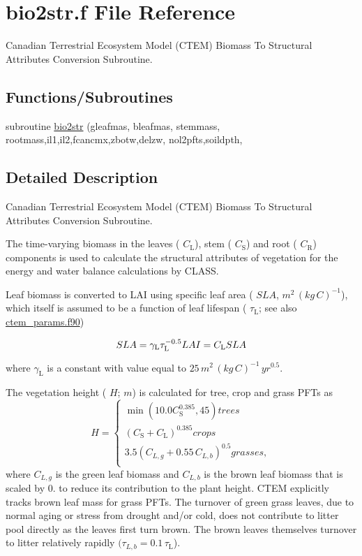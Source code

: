 \hypertarget{bio2str_8f}{}\section{bio2str.\+f File Reference}
\label{bio2str_8f}


Canadian Terrestrial Ecosystem Model (C\+T\+E\+M) Biomass To Structural Attributes Conversion Subroutine.  


\subsection*{Functions/\+Subroutines}
\begin{DoxyCompactItemize}
\item 
subroutine \hyperlink{bio2str_8f_a3bc457fd89cd3f3af038e068b38b5919}{bio2str} (gleafmas, bleafmas, stemmass, rootmass,il1,il2,fcancmx,zbotw,delzw, nol2pfts,soildpth,
\end{DoxyCompactItemize}


\subsection{Detailed Description}
Canadian Terrestrial Ecosystem Model (C\+T\+E\+M) Biomass To Structural Attributes Conversion Subroutine. 

The time-\/varying biomass in the leaves ( $C_\mathrm{L}$), stem ( $C_\mathrm{S}$) and root ( $C_\mathrm{R}$) components is used to calculate the structural attributes of vegetation for the energy and water balance calculations by C\+L\+A\+S\+S.

Leaf biomass is converted to L\+A\+I using specific leaf area ( ${SLA}$, $m^2\,(kg\,C)^{-1}$), which itself is assumed to be a function of leaf lifespan ( $\tau_\mathrm{L}$; see also \hyperlink{ctem__params_8f90}{ctem\+\_\+params.\+f90})

\[ \label{sla} SLA= \gamma_\mathrm{L}\tau_\mathrm{L}^{-0.5}\\ LAI = C_\mathrm{L}SLA\nonumber \]

where $\gamma_\mathrm{L}$ is a constant with value equal to $25\,m^2\,(kg\,C)^{-1}\,yr^{0.5}$.

The vegetation height ( $H$; $m$) is calculated for tree, crop and grass P\+F\+Ts as \[\label{height} H = \begin{cases} \min\left(10.0C_\mathrm{S}^{0.385},45\right) trees\\ (C_\mathrm{S} + C_\mathrm{L})^{0.385} crops\\ 3.5 (C_{L,g} + 0.55\,C_{L,b})^{0.5} grasses,\\ \end{cases} \] where $C_{L,g}$ is the green leaf biomass and $C_{L,b}$ is the brown leaf biomass that is scaled by 0. to reduce its contribution to the plant height. C\+T\+E\+M explicitly tracks brown leaf mass for grass P\+F\+Ts. The turnover of green grass leaves, due to normal aging or stress from drought and/or cold, does not contribute to litter pool directly as the leaves first turn brown. The brown leaves themselves turnover to litter relatively rapidly $(\tau_{L,b} = 0.1\,\tau_\mathrm{L}$).

